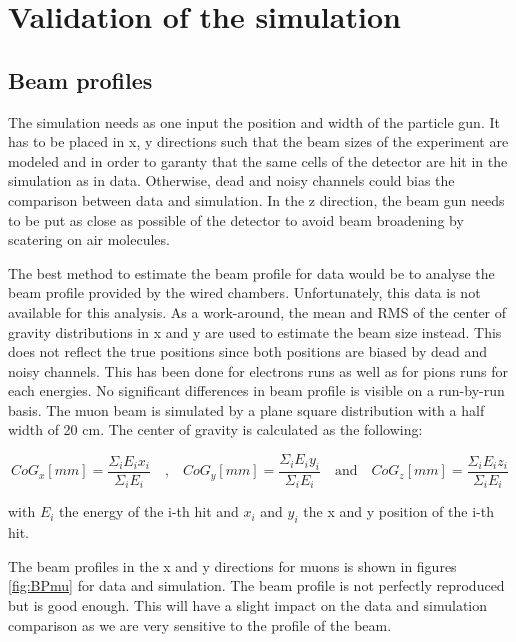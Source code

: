 \chapter{Validation of the simulation}
\label{appendix:SimulationVal}

\section{Beam profiles}

The simulation needs as one input the position and width of the particle gun. It has to be placed in x, y directions such that the beam sizes of the experiment are modeled and in order to garanty that the same cells of the detector are hit in the simulation as in data. Otherwise, dead and noisy channels could bias the comparison between data and simulation. In the z direction, the beam gun needs to be put as close as possible of the detector to avoid beam broadening by scatering on air molecules.

The best method to estimate the beam profile for data would be to analyse the beam profile provided by the wired chambers. Unfortunately, this data is not available for this analysis. As a work-around, the mean and RMS of the center of gravity distributions in x and y are used to estimate the beam size instead. This does not reflect the true positions since both positions are biased by dead and noisy channels. This has been done for electrons runs as well as for pions runs for each energies. No significant differences in beam profile is visible on a run-by-run basis. The muon beam is simulated by a plane square distribution with a half width of 20 cm. The center of gravity is calculated as the following:

\begin{equation}
  CoG_x [mm] = \frac{\Sigma_i E_i x_i}{\Sigma_i E_i} \quad \text{,} \quad CoG_y [mm] = \frac{\Sigma_i E_i y_i}{\Sigma_i E_i} \quad \text{and} \quad CoG_z [mm] = \frac{\Sigma_i E_i z_i}{\Sigma_i E_i}
\end{equation}

\noindent with $E_i$ the energy of the i-th hit and $x_i$ and $y_i$ the x and y position of the i-th hit.

The beam profiles in the x and y directions for muons is shown in figures \ref{fig:BPmu} for data and simulation. The beam profile is not perfectly reproduced but is good enough. This will have a slight impact on the data and simulation comparison as we are very sensitive to the
profile of the beam.

